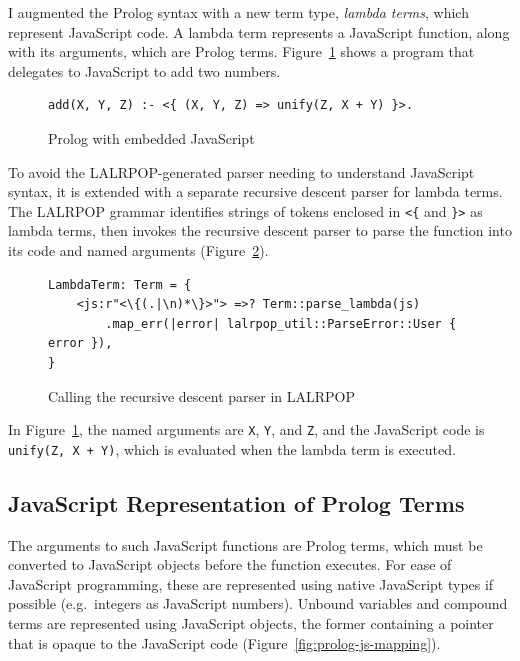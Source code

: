 I augmented the Prolog syntax with a new term type, \emph{lambda terms}, which represent JavaScript code. A lambda term represents a JavaScript function, along with its arguments, which are Prolog terms. Figure~\ref{fig:js-in-prolog} shows a program that delegates to JavaScript to add two numbers.

\begin{figure}[H]
\centering
\begin{verbatim}
add(X, Y, Z) :- <{ (X, Y, Z) => unify(Z, X + Y) }>.
\end{verbatim}
\caption{Prolog with embedded JavaScript}
\label{fig:js-in-prolog}
\end{figure}

To avoid the LALRPOP-generated parser needing to understand JavaScript syntax, it is extended with a separate recursive descent parser for lambda terms. The LALRPOP grammar identifies strings of tokens enclosed in \texttt{<\{} and \texttt{\}>} as lambda terms, then invokes the recursive descent parser to parse the function into its code and named arguments (Figure~\ref{fig:js-grammar}).

\begin{figure}[H]
\centering
\begin{verbatim}
LambdaTerm: Term = {
    <js:r"<\{(.|\n)*\}>"> =>? Term::parse_lambda(js)
        .map_err(|error| lalrpop_util::ParseError::User { error }),
}
\end{verbatim}
\caption{Calling the recursive descent parser in LALRPOP}
\label{fig:js-grammar}
\end{figure}

In Figure~\ref{fig:js-in-prolog}, the named arguments are \texttt{X}, \texttt{Y}, and \texttt{Z}, and the JavaScript code is \texttt{unify(Z, X + Y)}, which is evaluated when the lambda term is executed.

\subsection{JavaScript Representation of Prolog Terms}

\label{sec:js-prolog-mapping}

The arguments to such JavaScript functions are Prolog terms, which must be converted to JavaScript objects before the function executes. For ease of JavaScript programming, these are represented using native JavaScript types if possible (e.g.\ integers as JavaScript numbers). Unbound variables and compound terms are represented using JavaScript objects, the former containing a pointer that is opaque to the JavaScript code (Figure~\ref{fig:prolog-js-mapping}).

